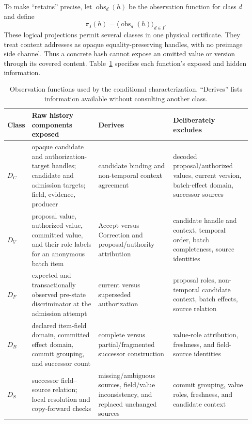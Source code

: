 To make ``retains'' precise, let $\operatorname{obs}_d(h)$ be the observation function for class $d$ and define
\begin{equation}
\pi_I(h)=\langle\operatorname{obs}_d(h)\rangle_{d\in I}.
\label{eq:observation-projection}
\end{equation}
These logical projections permit several classes in one physical certificate. They treat content addresses as opaque equality-preserving handles, with no preimage side channel. Thus a concrete hash cannot expose an omitted value or version through its covered content. Table~\ref{tab:observation-functions} specifies each function's exposed and hidden information.

\begin{table}[t]
\centering
\footnotesize
\caption{Observation functions used by the conditional characterization. ``Derives'' lists information available without consulting another class.}
\label{tab:observation-functions}
\begin{tabularx}{\textwidth}{@{}l>{\raggedright\arraybackslash}p{}>{\raggedright\arraybackslash}p{}>{\raggedright\arraybackslash}X@{}}
\toprule
Class & Raw history components exposed & Derives & Deliberately excludes \\
\midrule
$D_C$ & opaque candidate and authorization-target handles; candidate and admission targets; field, evidence, producer & candidate binding and non-temporal context agreement & decoded proposal/authorized values, current version, batch-effect domain, successor sources \\
$D_V$ & proposal value, authorized value, committed value, and their role labels for an anonymous batch item & Accept versus Correction and proposal/authority attribution & candidate handle and context, temporal order, batch completeness, source identities \\
$D_F$ & expected and transactionally observed pre-state discriminator at the admission attempt & current versus superseded authorization & proposal roles, non-temporal candidate context, batch effects, source relation \\
$D_B$ & declared item-field domain, committed effect domain, commit grouping, and successor count & complete versus partial/fragmented successor construction & value-role attribution, freshness, and field-source identities \\
$D_S$ & successor field--source relation; local resolution and copy-forward checks & missing/ambiguous sources, field/value inconsistency, and replaced unchanged sources & commit grouping, value roles, freshness, and candidate context \\
\bottomrule
\end{tabularx}
\end{table}

